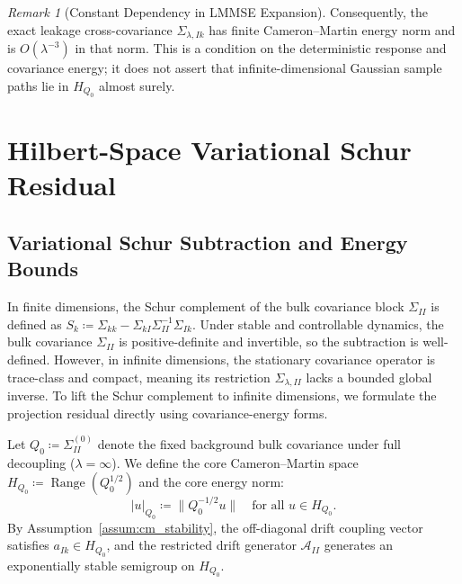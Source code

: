 \documentclass[11pt]{amsart}
\theoremstyle{plain}
\theoremstyle{definition}
\theoremstyle{remark}
\newtheorem{remark}[theorem]{Remark}
\begin{document}
\begin{remark}[Constant Dependency in LMMSE Expansion]
  Consequently, the exact leakage cross-covariance
  $\Sigma_{\lambda,Ik}$ has finite Cameron--Martin energy norm and is
  $O(\lambda^{-3})$ in that norm.  This is a condition on the deterministic
  response and covariance energy; it does not assert that infinite-dimensional
  Gaussian sample paths lie in $H_{Q_0}$ almost surely.
\end{remark}

\section{Hilbert-Space Variational Schur Residual}
\label{sec:infdim}

\subsection{Variational Schur Subtraction and Energy Bounds}
\label{sec:infdim:variational}

In finite dimensions, the Schur complement of the bulk covariance block $\Sigma_{II}$ is defined as $S_k \coloneqq \Sigma_{kk} - \Sigma_{kI} \Sigma_{II}^{-1} \Sigma_{Ik}$. Under stable and controllable dynamics, the bulk covariance $\Sigma_{II}$ is positive-definite and invertible, so the subtraction is well-defined. However, in infinite dimensions, the stationary covariance operator is trace-class and compact, meaning its restriction $\Sigma_{\lambda,II}$ lacks a bounded global inverse. To lift the Schur complement to infinite dimensions, we formulate the projection residual directly using covariance-energy forms.

Let $Q_0 \coloneqq \Sigma_{II}^{(0)}$ denote the fixed background bulk covariance under full decoupling ($\lambda = \infty$). We define the core Cameron--Martin space $H_{Q_0} \coloneqq \operatorname{Range}(Q_0^{1/2})$ and the core energy norm:
\begin{equation}
  |u|_{Q_0} \coloneqq \|Q_0^{-1/2} u\| \quad \text{for all } u \in H_{Q_0}.
\end{equation}
By Assumption~\ref{assum:cm_stability}, the off-diagonal drift coupling vector satisfies $a_{Ik} \in H_{Q_0}$, and the restricted drift generator $\mathcal{A}_{II}$ generates an exponentially stable semigroup on $H_{Q_0}$.
\end{document}
